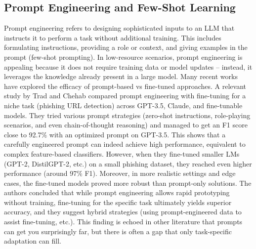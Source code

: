 \documentclass[12pt]{uomthesis}
\begin{document}
\subsection{Prompt Engineering and Few-Shot Learning}
Prompt engineering refers to designing sophisticated inputs to an LLM that instructs it to perform a task without additional training. This includes formulating instructions, providing a role or context, and giving examples in the prompt (few-shot prompting). In low-resource scenarios, prompt engineering is appealing because it does not require training data or model updates – instead, it leverages the knowledge already present in a large model. Many recent works have explored the efficacy of prompt-based vs fine-tuned approaches. A relevant study by Trad and Chehab \cite{23} compared prompt engineering with fine-tuning for a niche task (phishing URL detection) across GPT-3.5, Claude, and fine-tunable models. They tried various prompt strategies (zero-shot instructions, role-playing scenarios, and even chain-of-thought reasoning) and managed to get an F1 score close to 92.7\% with an optimized prompt on GPT-3.5. This shows that a carefully engineered prompt can indeed achieve high performance, equivalent to complex feature-based classifiers. However, when they fine-tuned smaller LMs (GPT-2, DistilGPT-2, etc.) on a small phishing dataset, they reached even higher performance (around 97\% F1). Moreover, in more realistic settings and edge cases, the fine-tuned models proved more robust than prompt-only solutions. The authors concluded that while prompt engineering allows rapid prototyping without training, fine-tuning for the specific task ultimately yields superior accuracy, and they suggest hybrid strategies (using prompt-engineered data to assist fine-tuning, etc.). This finding is echoed in other literature that prompts can get you surprisingly far, but there is often a gap that only task-specific adaptation can fill.
\end{document}
